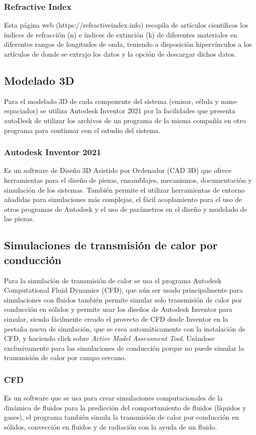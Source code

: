 \subsubsection{Refractive Index}
Esta página web (https://refractiveindex.info) recopila de artículos científicos los índices de refracción (n) e índices de extinción (k) de diferentes materiales en diferentes rangos de longitudes de onda, teniendo a disposición hipervínculos a los artículos de donde se extrajo los datos y la opción de descargar dichos datos.



\subsection{Modelado 3D}
Para el modelado 3D de cada componente del sistema (emisor, célula y nano-espaciador) se utiliza Autodesk Inventor 2021 por la facilidades que presenta autoDesk de utilizar los archivos de un programa de la misma compañía en otro programa para continuar con el estudio del sistema.
\subsubsection{Autodesk Inventor 2021}
Es un software de Diseño 3D Asistido por Ordenador (CAD 3D) que ofrece herramientas para el diseño de piezas, ensamblajes, mecanismos, documentación y simulación de los sistemas. También permite el utilizar herramientas de entorno añadidas para simulaciones más complejas, el fácil acoplamiento para el uso de otros programas de Autodesk y el uso de parámetros en el diseño y modelado de las piezas.

\subsection{Simulaciones de transmisión de calor por conducción}
Para la simulación de transmisión de calor se usa el programa Autodesk Computational Fluid Dynamics (CFD), que aún ser usado principalmente para simulaciones con fluidos también permite simular solo transmisión de calor por conducción en sólidos y permite usar los diseños de Autodesk Inventor para simular, siendo fácilmente creado el provecto de CFD desde Inventor en la pestaña nueva de simulación, que se crea automáticamente con la instalación de CFD, y haciendo click sobre \textit{Active Model Assessment Tool}. Usándose exclusivamente para las simulaciones de conducción porque no puede simular la transmisión de calor por campo cercano.
\subsubsection{CFD}
Es un software que se usa para crear simulaciones computacionales de la dinámica de fluidos para la predicción del comportamiento de fluidos (líquidos y gases), el programa también simula la transmisión de calor por conducción en sólidos, convección en fluidos y de radiación con la ayuda de un fluido.
